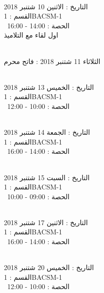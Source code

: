 \documentclass[14pt a4paper twocolumn]{book}
\begin{document}
\par
\noindent\makebox[\linewidth]{\rule{\paperwidth}{0.4pt}}
 \\
التاريخ : الاثنين 10 شتنبر 2018 \\
القسم : 1BACSM-1 \\
 \  
الحصة : 14:00 - 16:00 \\
\indent \indent
اول لقاء مع التلاميذ
\par
\noindent\makebox[\linewidth]{\rule{\paperwidth}{0.4pt}}
 \\
الثلاثاء 11 شتنبر 2018 :   فاتح محرم
\par
\noindent\makebox[\linewidth]{\rule{\paperwidth}{0.4pt}}
 \\
التاريخ : الخميس 13 شتنبر 2018 \\
القسم : 1BACSM-1 \\
 \  
الحصة : 10:00 - 12:00 \\
\par
\noindent\makebox[\linewidth]{\rule{\paperwidth}{0.4pt}}
 \\
التاريخ : الجمعة 14 شتنبر 2018 \\
القسم : 1BACSM-1 \\
 \  
الحصة : 14:00 - 16:00 \\
\par
\noindent\makebox[\linewidth]{\rule{\paperwidth}{0.4pt}}
 \\
التاريخ : السبت 15 شتنبر 2018 \\
القسم : 1BACSM-1 \\
 \  
الحصة : 09:00 - 10:00 \\
\par
\noindent\makebox[\linewidth]{\rule{\paperwidth}{0.4pt}}
 \\
التاريخ : الاثنين 17 شتنبر 2018 \\
القسم : 1BACSM-1 \\
 \  
الحصة : 14:00 - 16:00 \\
\par
\noindent\makebox[\linewidth]{\rule{\paperwidth}{0.4pt}}
 \\
التاريخ : الخميس 20 شتنبر 2018 \\
القسم : 1BACSM-1 \\
 \  
الحصة : 10:00 - 12:00 \\
\par
\end{document}
